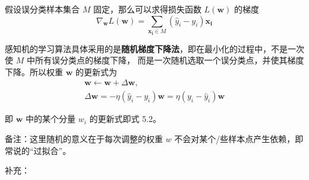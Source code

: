 \documentclass[../studies-ml.tex]{subfiles}
\begin{document}
\begin{enumerate}[I]
        假设误分类样本集合 $M$ 固定，那么可以求得损失函数 $L(\pmb{w})$ 的梯度
        \[ \nabla_{\pmb{w}} L(\pmb{w}) = \sum_{\pmb{x_i} \in M} (\hat{y}_i - y_i) \pmb{x_i} \]

        感知机的学习算法具体采用的是\textbf{随机梯度下降法}，即在最小化的过程中，不是一次使 $M$ 中所有误分类点的梯度下降，
        而是一次随机选取一个误分类点，并使其梯度下降。所以权重 $\pmb{w}$ 的更新式为
        \begin{gather*}
          \pmb{w} \leftarrow \pmb{w} + \Delta \pmb{w}, \\
          \Delta \pmb{w} = -\eta (\hat{y}_i - y_i) \pmb{w} = \eta (y_i - \hat{y}_i) \pmb{w}
        \end{gather*}

        即 $\pmb{w}$ 中的某个分量 $w_i$ 的更新式即式 5.2。

        备注：这里随机的意义在于每次调整的权重 $w$ 不会对某个/些样本点产生依赖，即常说的“过拟合”。
\end{enumerate}

补充：
\end{document}
